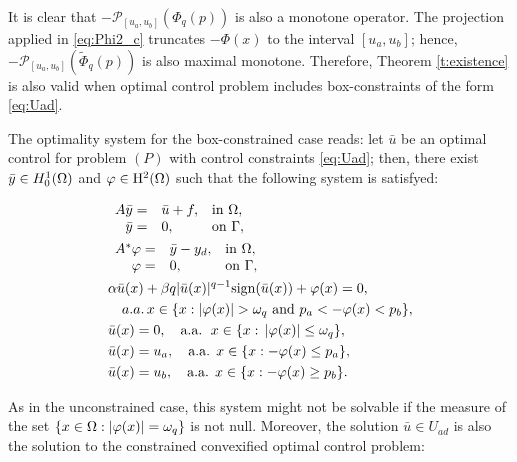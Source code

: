 It is clear that  $-\mathcal{P}_{[u_a,u_b]}(\Phi_q (p))	$ is also a monotone operator. The projection applied in \eqref{eq:Phi2_c} truncates $-\Phi(x)$ to the interval $[u_a,u_b]$; hence, $- \mathcal{P}_{[u_a,u_b]}(\tilde\Phi_q (p))$ is also maximal monotone. Therefore, Theorem \ref{t:existence} is also valid when optimal control problem includes box-constraints of the form \eqref{eq:Uad}. 

The optimality system for the box-constrained case reads: let $\bar u$ be an optimal 
control for problem $(P)$ with control constraints \eqref{eq:Uad}; then, there exist 
$\bar y \in H_{0}^{1}(\Omega)$ and $\varphi \in \rm{H}^2(\Omega)$ such that the following system is satisfyed:

\begin{subequations}\label{eq:system_box}
		\begin{align} 
			&	\begin{array}{rll}
				A \bar y=& \bar u + f, &\hbox{in  } \om, \\
				\bar y=&0, &\hbox{on  }  \Gamma,
			\end{array} \\
			&\begin{array}{rll}
				A^*   \varphi=& \bar y -y_d, &\hbox{in  } \om, \\
				\varphi=&0, &\hbox{on  }  \Gamma,
			\end{array}\\
			& \alpha \bar u (x) + \beta q |\bar u(x)|^{q-1} \sign(\bar u(x)) + \varphi(x)  = 0, \\
			& \quad a.a. \, x \in \{x: |\varphi(x)|>\omega_q \text{ and }  p_a<-\varphi(x)<p_b \},\nonumber\\
			& \bar u(x) =0, \quad \text{a.a. }  \, x \in \{x: \,  |\varphi(x)| \leq \omega_q\}, \\
			& \bar u(x) = u_a, \quad \text{a.a. } x \in \{x: -\varphi(x) \leq p_a\}, \\
			& \bar u(x) = u_b, \quad \text{a.a. } x \in \{x: -\varphi(x) \geq p_b\}.
		\end{align} 	
	\end{subequations}
	
As in the unconstrained case, this system might not be solvable if the measure of the set $\{x\in\Omega:|\varphi(x)|=\omega_q\}$ is not null. Moreover, the solution $\bar u \in U_{ad}$ is also the solution to the constrained convexified optimal control problem:

